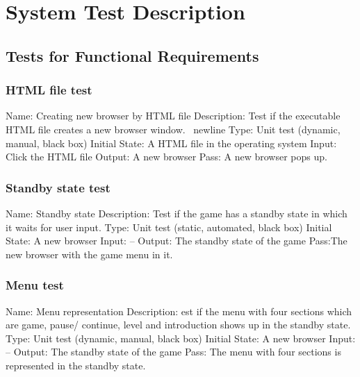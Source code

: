 \documentclass{article}
\begin{document}
\section{System Test Description}
\subsection{Tests for Functional Requirements}
\subsubsection{HTML file test}
Name:  Creating new browser by HTML file \newline
Description: Test if the executable HTML file creates a new browser window. 
Type: Unit test (dynamic, manual, black box) \newline
Initial State:  A HTML file in the operating system \newline
Input: Click the HTML file \newline
Output: A new browser \newline
Pass: A new browser pops up. \newline

\subsubsection{Standby state test}
Name:  Standby state\newline
Description: Test if the game has a standby state in which it waits for user 
input. \newline
Type: Unit test (static, automated, black box) \newline
Initial State: A new browser \newline
Input: -- \newline
Output: The standby state of the game \newline
Pass:The new browser with the game menu in it. \newline

\subsubsection{Menu test}
Name:  Menu representation\newline
Description: est if the menu with four sections which are game, pause/
continue, level and introduction shows up in the standby state. \newline
Type: Unit test (dynamic, manual, black box) \newline
Initial State: A new browser \newline
Input: -- \newline
Output: The standby state of the game\newline
Pass: The menu with four sections is represented in the standby state. \newline
\end{document}
